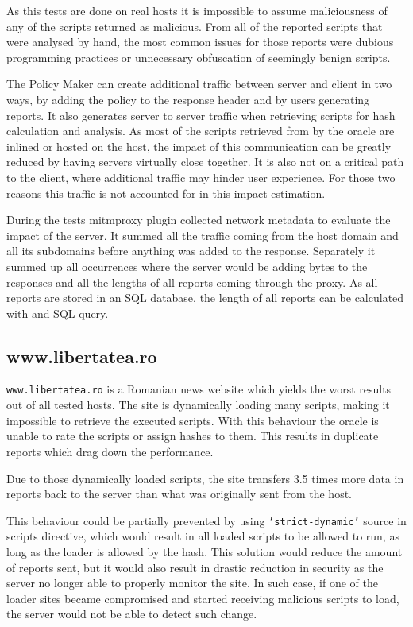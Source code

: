 As this tests are done on real hosts it is impossible to assume maliciousness of any of the scripts returned as malicious.
From all of the reported scripts that were analysed by hand, the most common issues for those reports were dubious programming practices or unnecessary obfuscation of seemingly benign scripts.

The Policy Maker can create additional traffic between server and client in two ways, by adding the policy to the response header and by users generating reports.
It also generates server to server traffic when retrieving scripts for hash calculation and analysis.
As most of the scripts retrieved from by the oracle are inlined or hosted on the host, the impact of this communication can be greatly reduced by having servers virtually close together.
It is also not on a critical path to the client, where additional traffic may hinder user experience.
For those two reasons this traffic is not accounted for in this impact estimation.

During the tests mitmproxy plugin collected network metadata to evaluate the impact of the server.
It summed all the traffic coming from the host domain and all its subdomains before anything was added to the response.
Separately it summed up all occurrences where the server would be adding bytes to the responses and all the lengths of all reports coming through the proxy.
As all reports are stored in an SQL database, the length of all reports can be calculated with and SQL query.

\subsection{www.libertatea.ro}

\texttt{www.libertatea.ro} is a Romanian news website which yields the worst results out of all tested hosts.
The site is dynamically loading many scripts, making it impossible to retrieve the executed scripts.
With this behaviour the oracle is unable to rate the scripts or assign hashes to them.
This results in duplicate reports which drag down the performance.

Due to those dynamically loaded scripts, the site transfers 3.5 times more data in reports back to the server than what was originally sent from the host.

This behaviour could be partially prevented by using \texttt{'strict-dynamic'} source in scripts directive, which would result in all loaded scripts to be allowed to run, as long as the loader is allowed by the hash.
This solution would reduce the amount of reports sent, but it would also result in drastic reduction in security as the server no longer able to properly monitor the site.
In such case, if one of the loader sites became compromised and started receiving malicious scripts to load, the server would not be able to detect such change.

